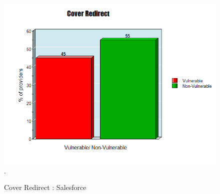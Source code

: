 \begin{figure}[t]
   		 \centering
   		 \includegraphics[width=\columnwidth]{figures/coverstats.png}.
   		 \caption{Cover Redirect : Salesforce }
   		 \label{fig:salesredir}
\end{figure}

